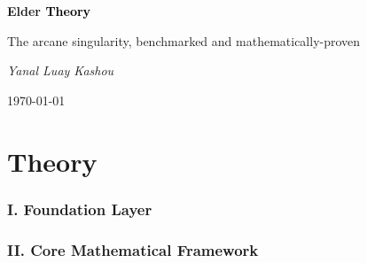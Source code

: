 \documentclass[11pt,twoside]{book}
\begin{document}
\frontmatter

\begin{titlepage}
    \centering
    \vspace*{2cm}
    {\Huge\bfseries \textcolor{DarkSkyBlue}{Elder }\textrm{\textcolor{black}{Theory}}\par}
    \vspace{2cm}
    {\Large The arcane singularity, benchmarked and mathematically-proven\par}
    \vspace{4cm}
    {\Large\itshape Yanal Luay Kashou\par}
    \vfill
    {\large \today\par}
\end{titlepage}

\tableofcontents

\mainmatter







\part{Theory}

\section*{I. Foundation Layer}

\section*{II. Core Mathematical Framework}
\end{document}

